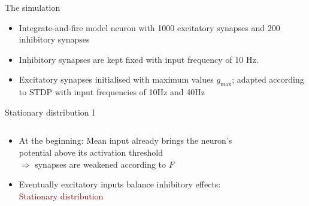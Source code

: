\documentclass[aspectratio=169]{beamer}
\begin{document}
\begin{frame}{The simulation}

\begin{itemize}
	\item<1-> Integrate-and-fire model neuron with 1000 excitatory synapses and 200 inhibitory synapses
	\item<2-> Inhibitory synapses are kept fixed with input frequency of 10 Hz.
	\item<3-> Excitatory synapses initialised with maximum values $g_{\max}$; adapted according to STDP with input frequencies of 10Hz and 40Hz
\end{itemize}

\end{frame}
\begin{frame}{Stationary distribution I}

\begin{columns}
	\begin{column}{0.5\textwidth}
	\begin{itemize}
		\item<1-> At the beginning: Mean input already brings the neuron's potential above its activation threshold\\
		$\Rightarrow$ synapses are weakened according to $F$
		\item<2-> Eventually excitatory inputs balance inhibitory effects: \textcolor{darkred}{Stationary distribution}
		
	\end{itemize}
		
	\end{column}
	\begin{column}{0.5\textwidth}
		\begin{figure}
			
			\centering
		\end{figure}
	\end{column}
\end{columns}

\end{frame}
\end{document}
